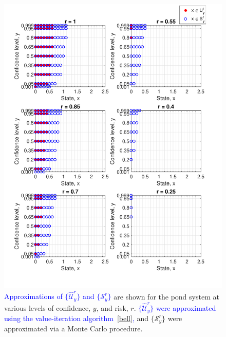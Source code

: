\documentclass[letterpaper, 10 pt, conference]{ieeeconf}  %
\begin{document}
\begin{figure}[thpb]
      \centering
      \includegraphics[scale=0.5]{output_CompareScript_Sept112018.pdf}
      \caption{ \textcolor{blue}{Approximations of $\{\widehat{\mathcal{U}}_y^r\}$ and $\{\mathcal{S}_y^r\}$} are shown for the pond system at various levels of confidence, $y$, and risk, $r$.
	  \textcolor{blue}{$\{\widehat{\mathcal{U}}_y^r\}$ were approximated using the value-iteration algorithm~\eqref{bell},} and $\{\mathcal{S}_y^r\}$ were approximated via a Monte Carlo procedure.} 
      \label{compare}
\end{figure}
\end{document}
